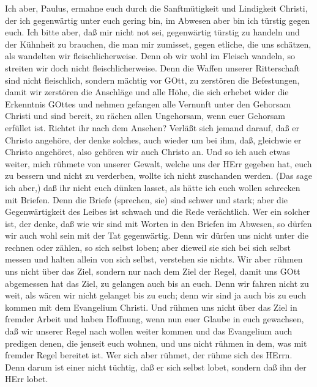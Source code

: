  Ich aber, Paulus, ermahne euch durch die Sanftmütigkeit und
Lindigkeit Christi, der ich gegenwärtig unter euch gering bin, im
Abwesen aber bin ich türstig gegen euch.  Ich bitte aber,
daß mir nicht not sei, gegenwärtig türstig zu handeln und der Kühnheit
zu brauchen, die man mir zumisset, gegen etliche, die uns schätzen, als
wandelten wir fleischlicherweise.  Denn ob wir wohl im
Fleisch wandeln, so streiten wir doch nicht fleischlicherweise.
 Denn die Waffen unserer Ritterschaft sind nicht
fleischlich, sondern mächtig vor GOtt, zu zerstören die Befestungen,
 damit wir zerstören die Anschläge und alle Höhe, die sich
erhebet wider die Erkenntnis GOttes und nehmen gefangen alle Vernunft
unter den Gehorsam Christi  und sind bereit, zu rächen allen
Ungehorsam, wenn euer Gehorsam erfüllet ist.  Richtet ihr
nach dem Ansehen? Verläßt sich jemand darauf, daß er Christo angehöre,
der denke solches, auch wieder um bei ihm, daß, gleichwie er Christo
angehöret, also gehören wir auch Christo an.  Und so ich
auch etwas weiter, mich rühmete von unserer Gewalt, welche uns der HErr
gegeben hat, euch zu bessern und nicht zu verderben, wollte ich nicht
zuschanden werden.  (Das sage ich aber,) daß ihr nicht euch
dünken lasset, als hätte ich euch wollen schrecken mit Briefen.
 Denn die Briefe (sprechen, sie) sind schwer und stark;
aber die Gegenwärtigkeit des Leibes ist schwach und die Rede
verächtlich.  Wer ein solcher ist, der denke, daß wie wir
sind mit Worten in den Briefen im Abwesen, so dürfen wir auch wohl sein
mit der Tat gegenwärtig.  Denn wir dürfen uns nicht unter
die rechnen oder zählen, so sich selbst loben; aber dieweil sie sich bei
sich selbst messen und halten allein von sich selbst, verstehen sie
nichts.  Wir aber rühmen uns nicht über das Ziel, sondern
nur nach dem Ziel der Regel, damit uns GOtt abgemessen hat das Ziel, zu
gelangen auch bis an euch.  Denn wir fahren nicht zu weit,
als wären wir nicht gelanget bis zu euch; denn wir sind ja auch bis zu
euch kommen mit dem Evangelium Christi.  Und rühmen uns
nicht über das Ziel in fremder Arbeit und haben Hoffnung, wenn nun euer
Glaube in euch gewachsen, daß wir unserer Regel nach wollen weiter
kommen  und das Evangelium auch predigen denen, die jenseit
euch wohnen, und uns nicht rühmen in dem, was mit fremder Regel bereitet
ist.  Wer sich aber rühmet, der rühme sich des HErrn.
 Denn darum ist einer nicht tüchtig, daß er sich selbst
lobet, sondern daß ihn der HErr lobet.

